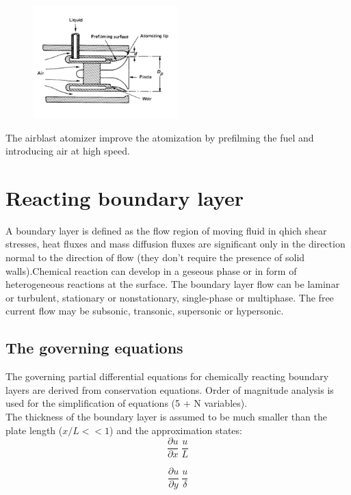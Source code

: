 \documentclass[12pt]{article}
\begin{document}
\begin{figure}[!ht]
\centering
\includegraphics[width=0.5\textwidth]{figures/airblast.png}
\end{figure}

The airblast atomizer improve the atomization by prefilming the fuel and introducing air at high speed.

\newpage

\section{Reacting boundary layer}

A boundary layer is defined as the flow region of moving fluid in qhich shear stresses, heat fluxes and mass diffusion fluxes are significant only in the direction normal to the direction of flow (they don't require the presence of solid walls).Chemical reaction can develop in a geseous phase or in form of heterogeneous reactions at the surface.
The boundary layer flow can be laminar or turbulent, stationary or nonstationary, single-phase or multiphase. The free current flow may be subsonic, transonic, supersonic or hypersonic.

\subsection{The governing equations}

The governing partial differential equations for chemically reacting boundary layers are derived from conservation equations. Order of magnitude analysis is used for the simplification of equations (5 + N variables).\\
The thickness of the boundary layer is assumed to be much smaller than the plate length ($x/L<<1$) and the approximation states:
\begin{equation}
    \frac{\partial u}{\partial x} ~ \frac{u}{L}
\end{equation}

\begin{equation}
    \frac{\partial u}{\partial y} ~ \frac{u}{\delta}
\end{equation}
\end{document}
